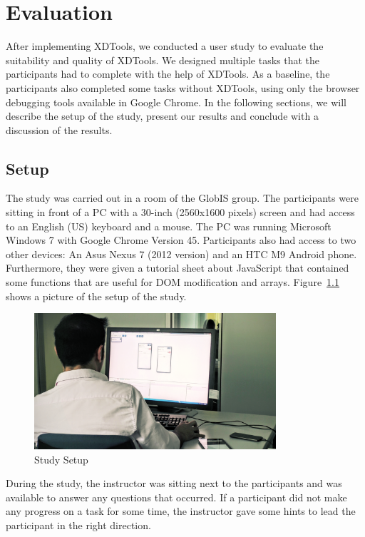 \chapter{Evaluation}

After implementing XDTools, we conducted a user study to evaluate the suitability and quality of XDTools. We designed multiple tasks that the participants had to complete with the help of XDTools. As a baseline, the participants also completed some tasks without XDTools, using only the browser debugging tools available in Google Chrome. In the following sections, we will describe the setup of the study, present our results and conclude with a discussion of the results.

\section{Setup}

The study was carried out in a room of the GlobIS group. The participants were sitting in front of a PC with a 30-inch (2560x1600 pixels) screen and had access to an English (US) keyboard and a mouse. The PC was running Microsoft Windows 7 with Google Chrome Version 45. Participants also had access to two other devices: An Asus Nexus 7 (2012 version) and an HTC M9 Android phone. Furthermore, they were given a tutorial sheet about JavaScript that contained some functions that are useful for DOM modification and arrays. Figure~\ref{fig:study_setup} shows a picture of the setup of the study.

\begin{figure}[h!]
  \centering
    \includegraphics[width=0.8\textwidth]{images/study_setup2.png}
	\caption[Photo: Study setup]{Study Setup}
	\label{fig:study_setup}
\end{figure}

During the study, the instructor was sitting next to the participants and was available to answer any questions that occurred. If a participant did not make any progress on a task for some time, the instructor gave some hints to lead the participant in the right direction.

